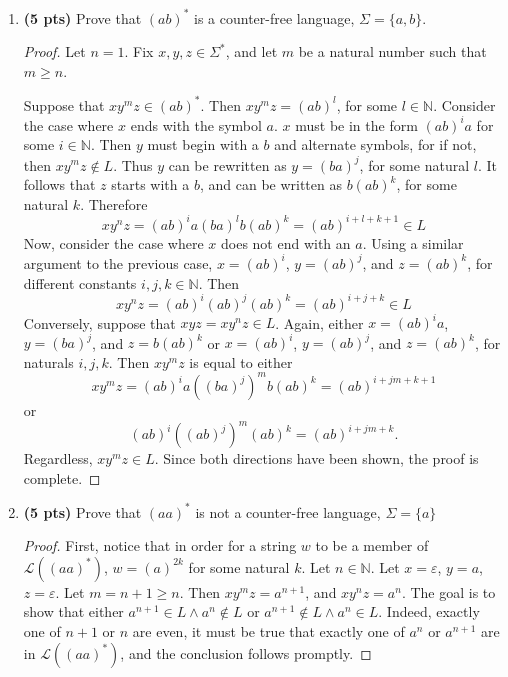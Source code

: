 \documentclass[11pt]{article}
\begin{document}
\begin{enumerate}[label=\textbf{Q\arabic*.}]
\begin{enumerate}[label=\textit{\alph*)}]
\begin{proof}
		Finally, \(w\) must end in a \(b\) because \(w \in \overline{\Sigma ^*\{a\}}\).

		This means that \(w = ab...ab\). It is obvious that \(w = (ab)^n\) for some \(n \in \mathbb{N}^+\). Thus \(w \in (ab)*\), proving that \((ab)^*\) can be matched by a star-free expression.
		\smallbreak
	\end{proof}

	\item \textbf{(5 pts)} Prove that $(ab)^*$ is a counter-free language,  $\Sigma = \{a,b\}$.
	
	\begin{proof}
		Let \(n = 1\). Fix \(x,y,z \in \Sigma ^*\), and let \(m\) be a natural number such that \(m \geq n\).

		Suppose that \(xy^m z \in (ab)^*\). Then \(xy^m z = (ab)^l\), for some \(l \in \mathbb{N}\). Consider the case where \(x\) ends with the symbol \(a\). \(x\) must be in the form \((ab)^i a\) for some \(i \in \mathbb{N}\). Then \(y\) must begin with a \(b\) and alternate symbols, for if not, then \(xy^m z \notin L\). Thus \(y\) can be rewritten as \(y = (ba)^j\), for some natural \(l\). It follows that \(z\) starts with a \(b\), and can be written as \(b(ab)^k\), for some natural \(k\). Therefore
		\[
			xy^n z = (ab)^i a (ba)^l b (ab)^k = (ab)^{i+l+k+1} \in L
		\]
		Now, consider the case where \(x\) does not end with an \(a\). Using a similar argument to the previous case, \(x = (ab)^i\), \(y = (ab)^j\), and \(z = (ab)^k\), for different constants \(i,j,k \in \mathbb{N}\). Then
		\[
			xy^n z = (ab)^i (ab)^j (ab)^k = (ab)^{i+j+k} \in L
		\]
		Conversely, suppose that \(xyz = xy^n z \in L\). Again, either \(x = (ab)^i a\), \(y = (ba)^j\), and \(z = b(ab)^k\) or \(x = (ab)^i\), \(y = (ab)^j\), and \(z = (ab)^k\), for naturals \(i,j,k\). Then \(xy^m z\) is equal to either
		\[
			xy^m z = (ab)^i a ((ba)^j)^m b(ab)^k = (ab)^{i+jm+k+1}
		\]
		or
		\[
			(ab)^i ((ab)^j)^m (ab)^k = (ab)^{i+jm+k} \text{.} 
		\]
		Regardless, \(xy^m z \in L\). Since both directions have been shown, the proof is complete.
		
	\end{proof}
	\item \textbf{(5 pts)} Prove that  $(aa)^*$ is not a counter-free language, $\Sigma = \{a\}$
	
	\begin{proof}
		First, notice that in order for a string \(w\) to be a member of \(\mathcal{L} ((aa)^*)\), \(w = (a)^{2k}\) for some natural \(k\). Let \(n \in \mathbb{N}\). Let \(x = \varepsilon\), \(y = a\), \(z = \varepsilon\). Let \(m = n + 1 \geq n\). Then \(xy^m z = a^{n+1} \), and \(xy^n z = a^n\). The goal is to show that either \(a^{n+1} \in L \land a^n \notin L\) or \(a^{n+1} \notin L \land a^n \in L\). Indeed, exactly one of \(n+1\) or \(n\) are even, it must be true that exactly one of \(a^n\) or \(a^{n+1}\) are in \(\mathcal{L} ((aa)^*)\), and the conclusion follows promptly.


\end{proof}
\end{enumerate}
\end{enumerate}
\end{document}
